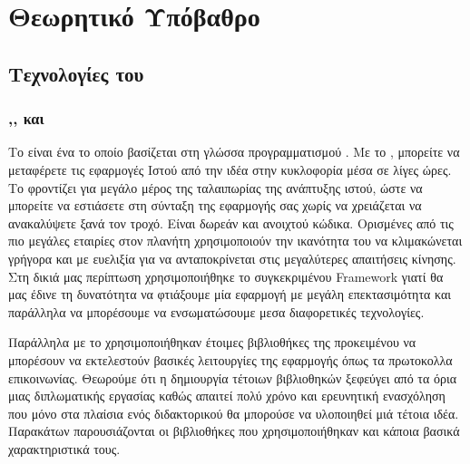 \chapter{Θεωρητικό Υπόβαθρο}

\section{Τεχνολογίες του }

\subsection{,,  και }

Το  είναι ένα  το οποίο βασίζεται στη γλώσσα προγραμματισμού . Με το , μπορείτε να μεταφέρετε τις εφαρμογές Ιστού από την ιδέα στην κυκλοφορία μέσα σε λίγες ώρες. Το  φροντίζει για μεγάλο μέρος
της ταλαιπωρίας της ανάπτυξης ιστού, ώστε να μπορείτε να εστιάσετε στη σύνταξη της εφαρμογής σας χωρίς να χρειάζεται να ανακαλύψετε ξανά τον τροχό.
Είναι δωρεάν και ανοιχτού κώδικα. Ορισμένες από τις πιο μεγάλες εταιρίες στον πλανήτη χρησιμοποιούν την ικανότητα του
να κλιμακώνεται γρήγορα και με ευελιξία για να ανταποκρίνεται στις μεγαλύτερες απαιτήσεις κίνησης. Στη δικιά μας περίπτωση χρησιμοποιήθηκε το συγκεκριμένου
{Framework} γιατί θα μας έδινε τη δυνατότητα να φτιάξουμε μία εφαρμογή με μεγάλη επεκτασιμότητα και παράλληλα να μπορέσουμε να ενσωματώσουμε μεσα διαφορετικές τεχνολογίες.

Παράλληλα με το  χρησιμοποιήθηκαν έτοιμες βιβλιοθήκες της  προκειμένου να μπορέσουν να εκτελεστούν βασικές λειτουργίες της εφαρμογής όπως 
τα πρωτοκολλα επικοινωνίας. Θεωρούμε ότι η δημιουργία τέτοιων βιβλιοθηκών ξεφεύγει από τα όρια μιας διπλωματικής εργασίας καθώς απαιτεί πολύ χρόνο και ερευνητική
ενασχόληση που μόνο στα πλαίσια ενός διδακτορικού θα μπορούσε να υλοποιηθεί μιά τέτοια ιδέα. Παρακάτων παρουσιάζονται οι βιβλιοθήκες που χρησιμοποιήθηκαν και κάποια βασικά χαρακτηριστικά τους.

